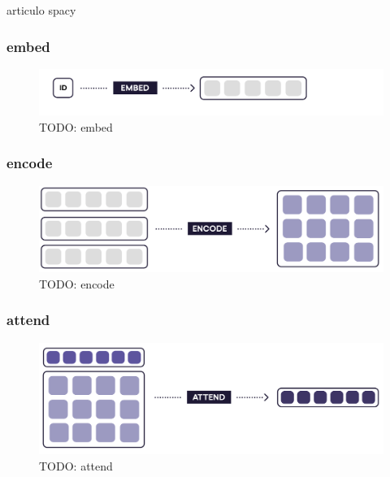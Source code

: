 \documentclass[12pt,a4paper,]{scrartcl}
\begin{document}
articulo spacy

\hypertarget{embed}{%
\subsubsection{embed}\label{embed}}

\begin{figure}[H]

{\centering \includegraphics{assets/deep-learning-formula-nlp_embed.pdf} 

}

\caption{TODO: embed}\label{fig:formula-embed}
\end{figure}

\hypertarget{encode}{%
\subsubsection{encode}\label{encode}}

\begin{figure}[H]

{\centering \includegraphics{assets/deep-learning-formula-nlp_encode.pdf} 

}

\caption{TODO: encode}\label{fig:formula-encode}
\end{figure}

\hypertarget{attend}{%
\subsubsection{attend}\label{attend}}

\begin{figure}[H]

{\centering \includegraphics{assets/deep-learning-formula-nlp_attend.pdf} 

}

\caption{TODO: attend}\label{fig:formula-attend}
\end{figure}
\end{document}
